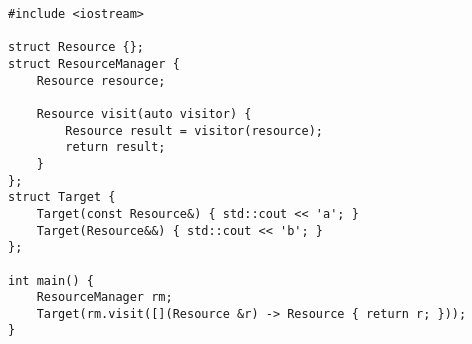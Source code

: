 \begin{lstlisting}[title=\href{https://godbolt.org/z/3Bz1yV}{\texttt{godbolt.org/z/3Bz1yV}}]
#include <iostream>

struct Resource {};
struct ResourceManager {
    Resource resource;

    Resource visit(auto visitor) {
        Resource result = visitor(resource);
        return result;
    }
};
struct Target {
    Target(const Resource&) { std::cout << 'a'; }
    Target(Resource&&) { std::cout << 'b'; }
};

int main() {
    ResourceManager rm;
    Target(rm.visit([](Resource &r) -> Resource { return r; }));
}
\end{lstlisting}
